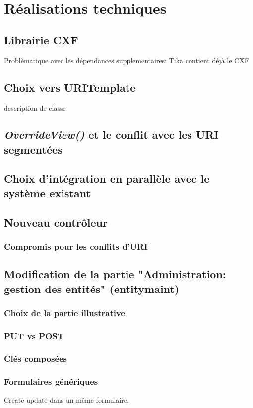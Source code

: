 \newpage

\section{Réalisations techniques}

\subsection{Librairie CXF}
Problèmatique avec les dépendances supplementaires: 
Tika contient déjà le CXF
\subsection{Choix vers URITemplate}
description de classe
\subsection{\textit{OverrideView()} et le conflit avec les URI segmentées}
\subsection{Choix d'intégration en parallèle avec le système existant }
\subsection{Nouveau contrôleur}
\subsubsection{Compromis pour les conflits d'URI}

\subsection{Modification de la partie "Administration: gestion des entités"  (entitymaint)  }
\subsubsection{Choix de la partie illustrative}
\subsubsection{PUT vs POST}
\subsubsection{Clés composées}
\subsubsection{Formulaires génériques }
Create update dans un même formulaire.
